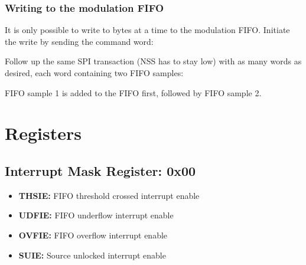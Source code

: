 \documentclass{article}
\newcommand{\bitrect}[2]{
  \begin{pgfonlayer}{foreground}
    \draw [thick] (0,0) rectangle (#1,1);
    \pgfmathsetmacro\result{#1-1}
    \foreach \x in {1,...,\result}
      \draw [thick] (\x,1) -- (\x, 0.8);
  \end{pgfonlayer}
  \bitlabels{#1}{#2}
}
\newcommand{\rwbits}[3]{
  \draw [thick] (#1,0) rectangle ++(#2,1) node[pos=0.5]{#3};
  \pgfmathsetmacro\start{#1+0.5}
  \pgfmathsetmacro\finish{#1+#2-0.5}
}
\newcommand{\robits}[3]{
  \begin{pgfonlayer}{background}
    \draw [thick, fill=lightgray] (#1,0) rectangle ++(#2,1) node[pos=0.5]{#3};
  \end{pgfonlayer}
  \pgfmathsetmacro\start{#1+0.5}
  \pgfmathsetmacro\finish{#1+#2-0.5}
}
\newcommand{\bitlabels}[2]{
  \foreach \bit in {1,...,#1}{
     \pgfmathsetmacro\result{#2}
     \node [above] at (\bit-0.5, 1) {\pgfmathprintnumber{\result}};
   }
}
\begin{document}
\subsubsection{Writing to the modulation FIFO}
It is only possible to write to bytes at a time to the modulation FIFO. Initiate the write by sending the command word:
\begin{center}
\end{center}
Follow up the same SPI transaction (NSS has to stay low) with as many words as desired, each word containing two FIFO samples:
\begin{center}
\end{center}
FIFO sample 1 is added to the FIFO first, followed by FIFO sample 2.

\section{Registers}
\subsection{Interrupt Mask Register: 0x00}
\begin{center}
\end{center}
\begin{itemize}
\item \textbf{THSIE:} FIFO threshold crossed interrupt enable
\item \textbf{UDFIE:} FIFO underflow interrupt enable 
\item \textbf{OVFIE:} FIFO overflow interrupt enable
\item \textbf{SUIE:} Source unlocked interrupt enable
\end{itemize}
\end{document}
